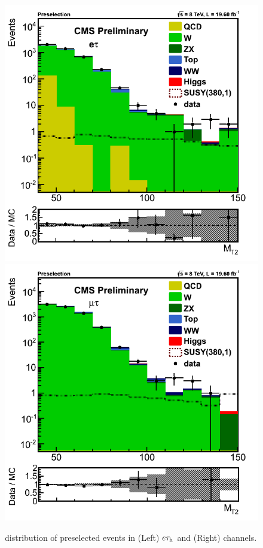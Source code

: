 \begin{figure}[!Hhtb]
\centering
\includegraphics[angle=0,scale=0.375]{SelectionEleTau/MT2.png}
\includegraphics[angle=0,scale=0.375]{SelectionMuTau/MT2_Ratio_Preselection_unBlinded.png}
\caption{\mttwo distribution of preselected events in (Left) $e\tau_{\rm h}$ and (Right) \muTau channels.}
\label{fig:mt2leptontau}
\end{figure}

